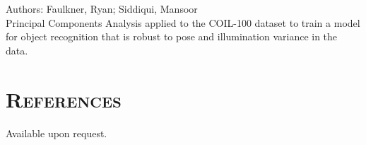 \begin{resume}
\begin{position}
Authors: Faulkner, Ryan; Siddiqui, Mansoor \\
Principal Components Analysis applied to the COIL-100 dataset to train a model for object recognition that is robust to pose and illumination variance in the data.
\end{position}










\section{\textsc{References}}

Available upon request.






\end{resume}

